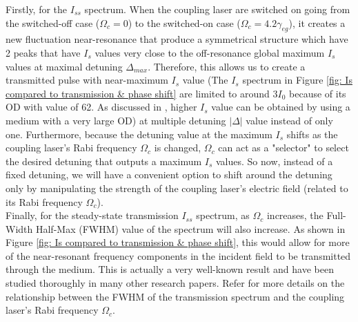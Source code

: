 Firstly, for the $I_{ss}$ spectrum. When the coupling laser are switched on going from the switched-off case ($\Omega_{c} = 0$) to the switched-on case ($\Omega_{c} = 4.2\gamma_{eg}$), it creates a new fluctuation near-resonance that produce a symmetrical structure which have 2 peaks that have $I_{s}$ values very close to the off-resonance global maximum $I_{s}$ values at maximal detuning $\Delta_{max}$. Therefore, this allows us to create a transmitted pulse with near-maximum $I_{s}$ value (The $I_{s}$ spectrum in Figure \ref{fig: Is compared to transmission & phase shift} are limited to around $3I_{0}$ because of its OD with value of 62. As discussed in \cite{Kwong2017}, higher $I_{s}$ value can be obtained by using a medium with a very large OD) at multiple detuning $|\Delta|$ value instead of only one. Furthermore, because the detuning value at the maximum $I_{s}$ shifts as the coupling laser's Rabi frequency $\Omega_{c}$ is changed, $\Omega_{c}$ can act as a "selector" to select the desired detuning that outputs a maximum $I_{s}$ values. So now, instead of a fixed detuning, we will have a convenient option to shift around the detuning only by manipulating the strength of the coupling laser's electric field (related to its Rabi frequency $\Omega_{c}$).\\

Finally, for the steady-state transmission $I_{ss}$ spectrum, as $\Omega_{c}$ increases, the Full-Width Half-Max (FWHM) value of the spectrum will also increase. As shown in Figure \ref{fig: Is compared to transmission & phase shift}, this would allow for more of the near-resonant frequency components in the incident field to be transmitted through the medium. This is actually a very well-known result and have been studied thoroughly in many other research papers. Refer \cite{} for more details on the relationship between the FWHM of the transmission spectrum and the coupling laser's Rabi frequency $\Omega_{c}$.
